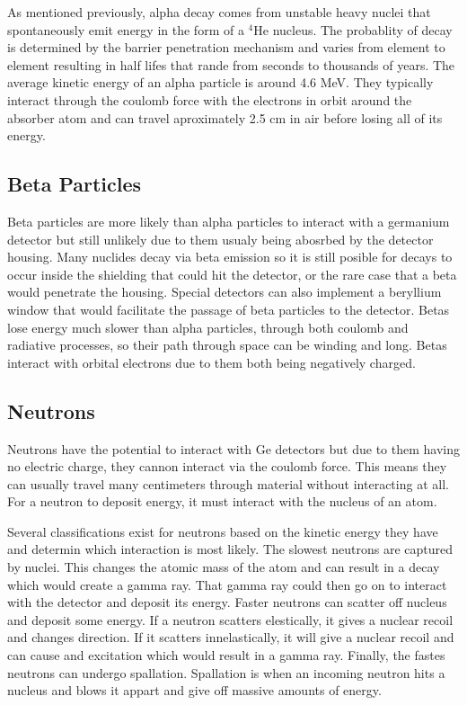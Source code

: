 As mentioned previously, alpha decay comes from unstable heavy nuclei that spontaneously emit energy in the form of a $^{4}$He nucleus.
The probablity of decay is determined by the barrier penetration mechanism and varies from element to element resulting in half lifes that rande from seconds to thousands of years.
The average kinetic energy of an alpha particle is around 4.6 MeV.
They typically interact through the coulomb force with the electrons in orbit around the absorber atom and can travel aproximately 2.5 cm in air before losing all of its energy.

\subsection{Beta Particles}
Beta particles are more likely than alpha particles to interact with a germanium detector but still unlikely due to them usualy being abosrbed by the detector housing.
Many nuclides decay via beta emission so it is still posible for decays to occur inside the shielding that could hit the detector, or the rare case that a beta would penetrate the housing.
Special detectors can also implement a beryllium window that would facilitate the passage of beta particles to the detector.
Betas lose energy much slower than alpha particles, through both coulomb and radiative processes, so their path through space can be winding and long.
Betas interact with orbital electrons due to them both being negatively charged.


\subsection{Neutrons}
Neutrons have the potential to interact with Ge detectors but due to them having no electric charge, they cannon interact via the coulomb force.
This means they can usually travel many centimeters through material without interacting at all.
For a neutron to deposit energy, it must interact with the nucleus of an atom.

Several classifications exist for neutrons based on the kinetic energy they have and determin which interaction is most likely.
The slowest neutrons are captured by nuclei.
This changes the atomic mass of the atom and can result in a decay which would create a gamma ray.
That gamma ray could then go on to interact with the detector and deposit its energy.
Faster neutrons can scatter off nucleus and deposit some energy.
If a neutron scatters elestically, it gives a nuclear recoil and changes direction.
If it scatters innelastically, it will give a nuclear recoil and can cause and excitation which would result in a gamma ray.
Finally, the fastes neutrons can undergo spallation.
Spallation is when an incoming neutron hits a nucleus and blows it appart and give off massive amounts of energy.

